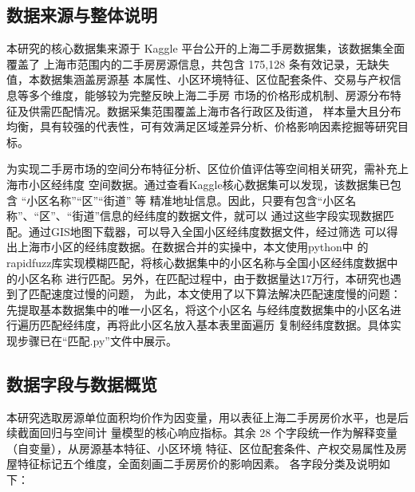 \documentclass[UTF8]{ctexart}
\begin{document}
\subsection{数据来源与整体说明} 

本研究的核心数据集来源于 Kaggle 平台公开的上海二手房数据集，该数据集全面覆盖了
上海市范围内的二手房房源信息，共包含 175,128 条有效记录，无缺失值，本数据集涵盖房源基
本属性、小区环境特征、区位配套条件、交易与产权信息等多个维度，能够较为完整反映上海二手房
市场的价格形成机制、房源分布特征及供需匹配情况。数据采集范围覆盖上海市各行政区及街道，
样本量大且分布均衡，具有较强的代表性，可有效满足区域差异分析、价格影响因素挖掘等研究目标。

为实现二手房市场的空间分布特征分析、区位价值评估等空间相关研究，需补充上海市小区经纬度
空间数据。通过查看Kaggle核心数据集可以发现，该数据集已包含 “小区名称”“区”“街道” 等
精准地址信息。因此，只要有包含“小区名称”、“区”、“街道”信息的经纬度的数据文件，就可以
通过这些字段实现数据匹配。通过GIS地图下载器，可以导入全国小区经纬度数据文件，经过筛选
可以得出上海市小区的经纬度数据。在数据合并的实操中，本文使用python中
的rapidfuzz库实现模糊匹配，将核心数据集中的小区名称与全国小区经纬度数据中的小区名称
进行匹配。另外，在匹配过程中，由于数据量达17万行，本研究也遇到了匹配速度过慢的问题，
为此，本文使用了以下算法解决匹配速度慢的问题：先提取基本数据集中的唯一小区名，将这个小区名
与经纬度数据集中的小区名进行遍历匹配经纬度，再将此小区名放入基本表里面遍历
复制经纬度数据。具体实现步骤已在“匹配.py”文件中展示。



\subsection{数据字段与数据概览}

本研究选取房源单位面积均价作为因变量，用以表征上海二手房房价水平，也是后续截面回归与空间计
量模型的核心响应指标。其余 28 个字段统一作为解释变量（自变量），从房源基本特征、小区环境
特征、区位配套条件、产权交易属性及房屋特征标记五个维度，全面刻画二手房房价的影响因素。
各字段分类及说明如下：
\end{document}

